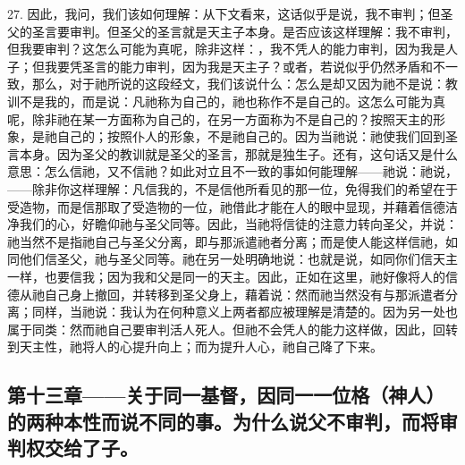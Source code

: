 27. 因此，我问，我们该如何理解：从下文看来，这话似乎是说，我不审判；但圣父的圣言要审判。但圣父的圣言就是天主子本身。是否应该这样理解：我不审判，但我要审判？这怎么可能为真呢，除非这样：，我不凭人的能力审判，因为我是人子；但我要凭圣言的能力审判，因为我是天主子？或者，若说似乎仍然矛盾和不一致，那么，对于祂所说的这段经文，我们该说什么：怎么是却又因为祂不是说：教训不是我的，而是说：凡祂称为自己的，祂也称作不是自己的。这怎么可能为真呢，除非祂在某一方面称为自己的，在另一方面称为不是自己的？按照天主的形象，是祂自己的；按照仆人的形象，不是祂自己的。因为当祂说：祂使我们回到圣言本身。因为圣父的教训就是圣父的圣言，那就是独生子。还有，这句话又是什么意思：怎么信祂，又不信祂？如此对立且不一致的事如何能理解——祂说：祂说，——除非你这样理解：凡信我的，不是信他所看见的那一位，免得我们的希望在于受造物，而是信那取了受造物的一位，祂借此才能在人的眼中显现，并藉着信德洁净我们的心，好瞻仰祂与圣父同等。因此，当祂将信徒的注意力转向圣父，并说：祂当然不是指祂自己与圣父分离，即与那派遣祂者分离；而是使人能这样信祂，如同他们信圣父，祂与圣父同等。祂在另一处明确地说：也就是说，如同你们信天主一样，也要信我；因为我和父是同一的天主。因此，正如在这里，祂好像将人的信德从祂自己身上撤回，并转移到圣父身上，藉着说：然而祂当然没有与那派遣者分离；同样，当祂说：我认为在何种意义上两者都应被理解是清楚的。因为另一处也属于同类：然而祂自己要审判活人死人。但祂不会凭人的能力这样做，因此，回转到天主性，祂将人的心提升向上；而为提升人心，祂自己降了下来。\par


\subsection{第十三章——关于同一基督，因同一一位格（神人）的两种本性而说不同的事。为什么说父不审判，而将审判权交给了子。}

